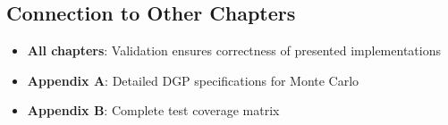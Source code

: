 \subsection{Connection to Other Chapters}

\begin{itemize}
\item \textbf{All chapters}: Validation ensures correctness of presented implementations
\item \textbf{Appendix A}: Detailed DGP specifications for Monte Carlo
\item \textbf{Appendix B}: Complete test coverage matrix
\end{itemize}

